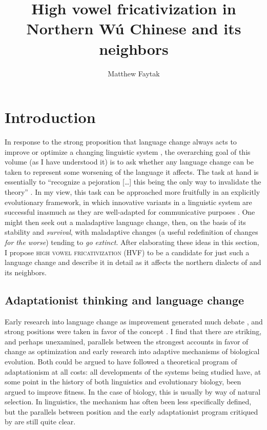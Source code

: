 \documentclass[output=paper,hidelinks]{langscibook}
\title{High vowel fricativization in Northern W\'{u} Chinese and its neighbors}
\author{Matthew Faytak\affiliation{ University at Buffalo}}
\begin{document}
\maketitle

\section{Introduction}\label{sec:faytak:1}

In response to the strong proposition that language change always acts to improve or optimize a changing linguistic system \citep{giacalone-ramat, vennemann}, the overarching goal of this volume (as I have understood it) is to ask whether any language change can be taken to represent some worsening of the language it affects. The task at hand is essentially to ``recognize a pejoration [\ldots{}] this being the only way to invalidate the theory'' \citep[13]{vennemann}. In my view, this task can be approached more fruitfully in an explicitly evolutionary framework, in which innovative variants in a linguistic system are successful inasmuch as they are well-adapted for communicative purposes \citep{wedel-exemplar, blevins-synopsis}. One might then seek out a maladaptive language change, then, on the basis of its stability and \textit{survival}, with maladaptive changes (a useful redefinition of changes \textit{for the worse}) tending to \textit{go extinct}. After elaborating these ideas in this section, I propose \textsc{high vowel fricativization} (HVF) to be a candidate for just such a language change and describe it in detail as it affects the northern dialects of  and its neighbors.

\subsection{Adaptationist thinking and language change}\largerpage

Early research into language change as improvement generated much debate \citep{lass, samuels, lass-shitting}, and strong positions were taken in favor of the concept \citep{giacalone-ramat, vennemann}. I find that there are striking, and perhaps unexamined, parallels between the strongest accounts in favor of change as optimization and early research into adaptive mechanisms of biological evolution. Both could be argued to have followed a theoretical program of adaptationism at all costs: all developments of the systems being studied have, at some point in the history of both linguistics and evolutionary biology, been argued to improve fitness. In the case of biology, this is usually by way of natural selection. In linguistics, the mechanism has often been less specifically defined, but the parallels between  position and the early adaptationist program critiqued by \citet{gould-lewontin} are still quite clear.
\end{document}
